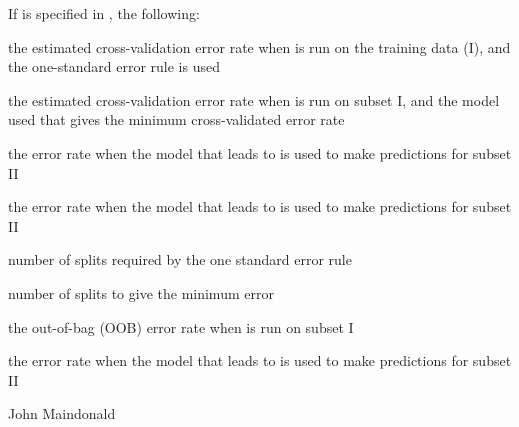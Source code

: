 \begin{Value}
If  is specified in , the following:

\begin{ldescription}
\item[\code{rpSEcvI}] the estimated cross-validation error rate
when  is run on the training data (I), and the
one-standard error rule is used
\item[\code{rpcvI}] the estimated cross-validation error rate when 
 is run on subset I, and the model used that
gives the minimum cross-validated error rate
\item[\code{rpSEtest}] the error rate when the model that leads to 
is used to make predictions for subset II
\item[\code{rptest}] the error rate when the model that leads to 
is used to make predictions for subset II
\item[\code{nSErule}] number of splits required by the one standard error rule
\item[\code{nREmin}] number of splits to give the minimum error
\item[\code{rfcvI}] the out-of-bag (OOB) error rate when 
 is run on subset I
\item[\code{rftest}] the error rate when the model that leads to 
is used to make predictions for subset II
\end{ldescription}
\end{Value}
\begin{Author}\relax
John Maindonald
\end{Author}

